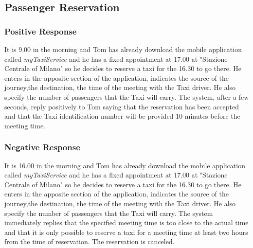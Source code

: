 \subsection{Passenger Reservation}
\subsubsection{Positive Response}
It is 9.00 in the morning and Tom has already download the mobile application called \textit{myTaxiService} and he has a fixed appointment at 17.00 at "Stazione Centrale of Milano" so he decides to reserve a taxi for the 16.30 to go there. He enters in the apposite section of the application, indicates the source of the journey,the destination, the time of the meeting with the Taxi driver. He also specify the number of passengers that the Taxi will carry. The system, after a few seconds, reply positively to Tom saying that the reservation has been accepted and that the Taxi identification number will be provided 10 minutes before the meeting time.

\subsubsection{Negative Response}
It is 16.00 in the morning and Tom has already download the mobile application called \textit{myTaxiService} and he has a fixed appointment at 17.00 at "Stazione Centrale of Milano" so he decides to reserve a taxi for the 16.30 to go there. He enters in the apposite section of the application, indicates the source of the journey,the destination, the time of the meeting with the Taxi driver. He also specify the number of passengers that the Taxi will carry.
The system immediately replies that the specified meeting time is too close to the actual time and that it is only possible to reserve a taxi for a meeting time at least two hours from the time of reservation. The reservation is canceled.